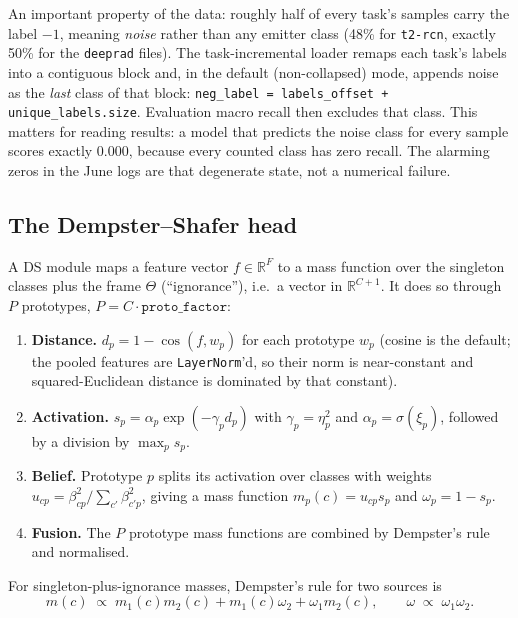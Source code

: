 \documentclass{article}
\begin{document}
An important property of the data: roughly half of every task's samples carry
the label $-1$, meaning \emph{noise} rather than any emitter class (48\% for
\texttt{t2-rcn}, exactly 50\% for the \texttt{deeprad} files). The task-incremental
loader remaps each task's labels into a contiguous block and, in the default
(non-collapsed) mode, appends noise as the \emph{last} class of that block:
\texttt{neg\_label = labels\_offset + unique\_labels.size}. Evaluation macro
recall then excludes that class. This matters for reading results: a model that
predicts the noise class for every sample scores exactly $0.000$, because every
counted class has zero recall. The alarming zeros in the June logs are that
degenerate state, not a numerical failure.

\subsection{The Dempster--Shafer head}

A DS module maps a feature vector $f \in \mathbb{R}^{F}$ to a mass function over
the singleton classes plus the frame $\Theta$ (``ignorance''), i.e.\ a vector in
$\mathbb{R}^{C+1}$. It does so through $P$ prototypes, $P = C \cdot
\texttt{proto\_factor}$:

\begin{enumerate}
  \item \textbf{Distance.} $d_p = 1 - \cos(f, w_p)$ for each prototype $w_p$
        (cosine is the default; the pooled features are \texttt{LayerNorm}'d, so
        their norm is near-constant and squared-Euclidean distance is dominated
        by that constant).
  \item \textbf{Activation.} $s_p = \alpha_p \exp(-\gamma_p d_p)$ with
        $\gamma_p=\eta_p^2$ and $\alpha_p=\sigma(\xi_p)$, followed by a division
        by $\max_p s_p$.
  \item \textbf{Belief.} Prototype $p$ splits its activation over classes with
        weights $u_{cp} = \beta_{cp}^2 / \sum_{c'}\beta_{c'p}^2$, giving a mass
        function $m_p(c) = u_{cp}s_p$ and $\omega_p = 1 - s_p$.
  \item \textbf{Fusion.} The $P$ prototype mass functions are combined by
        Dempster's rule and normalised.
\end{enumerate}

For singleton-plus-ignorance masses, Dempster's rule for two sources is
\begin{equation}
m(c) \;\propto\; m_1(c)m_2(c) + m_1(c)\omega_2 + \omega_1 m_2(c),
\qquad
\omega \;\propto\; \omega_1\omega_2 .
\label{eq:dempster}
\end{equation}
\end{document}

